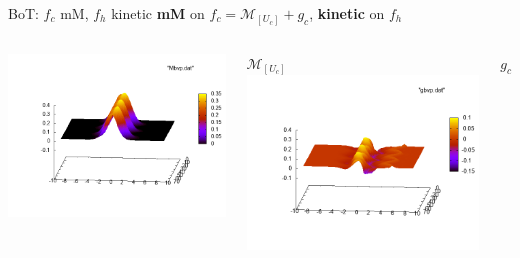 \documentclass{beamer}
\begin{document}
  \begin{frame}{BoT: $f_c$ mM, $f_h$ kinetic}
  	\textbf{mM} on $f_c = \mathcal{M}_{[U_c]}+g_c$, \textbf{kinetic} on $f_h$
  	\begin{columns}[c]
        \includegraphics[width=\textwidth]{img/Mbvp_mM.png}

        $\mathcal{M}_{[U_c]}$
        \includegraphics[width=\textwidth]{img/gbvp_mM.png}

        $g_c$
    \end{columns}
  \end{frame}
\end{document}
